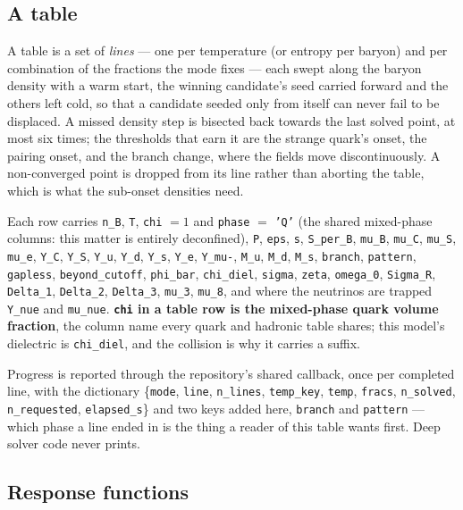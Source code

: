 \documentclass[11pt,a4paper]{article}
\newcommand{\code}[1]{\texttt{#1}}
\begin{document}
\subsection{A table}

A table is a set of \emph{lines} --- one per temperature (or entropy per
baryon) and per combination of the fractions the mode fixes --- each swept
along the baryon density with a warm start, the winning candidate's seed
carried forward and the others left cold, so that a candidate seeded only from
itself can never fail to be displaced. A missed density step is bisected back
towards the last solved point, at most six times; the thresholds that earn it
are the strange quark's onset, the pairing onset, and the branch change, where
the fields move discontinuously. A non-converged point is dropped from its line
rather than aborting the table, which is what the sub-onset densities need.

Each row carries \code{n\_B}, \code{T}, \code{chi} $=1$ and \code{phase}
$=$ \code{'Q'} (the shared mixed-phase columns: this matter is entirely
deconfined), \code{P}, \code{eps}, \code{s}, \code{S\_per\_B}, \code{mu\_B},
\code{mu\_C}, \code{mu\_S}, \code{mu\_e}, \code{Y\_C}, \code{Y\_S},
\code{Y\_u}, \code{Y\_d}, \code{Y\_s}, \code{Y\_e}, \code{Y\_mu-},
\code{M\_u}, \code{M\_d}, \code{M\_s}, \code{branch}, \code{pattern},
\code{gapless}, \code{beyond\_cutoff}, \code{phi\_bar}, \code{chi\_diel},
\code{sigma}, \code{zeta}, \code{omega\_0}, \code{Sigma\_R}, \code{Delta\_1},
\code{Delta\_2}, \code{Delta\_3}, \code{mu\_3}, \code{mu\_8}, and where the
neutrinos are trapped \code{Y\_nue} and \code{mu\_nue}. \textbf{\code{chi} in a
table row is the mixed-phase quark volume fraction}, the column name every
quark and hadronic table shares; this model's dielectric is \code{chi\_diel},
and the collision is why it carries a suffix.

Progress is reported through the repository's shared callback, once per
completed line, with the dictionary
\{\code{mode}, \code{line}, \code{n\_lines}, \code{temp\_key}, \code{temp},
\code{fracs}, \code{n\_solved}, \code{n\_requested}, \code{elapsed\_s}\}
and two keys added here, \code{branch} and \code{pattern} --- which phase a
line ended in is the thing a reader of this table wants first. Deep solver code
never prints.

\subsection{Response functions}
\label{sec:response}
\end{document}
